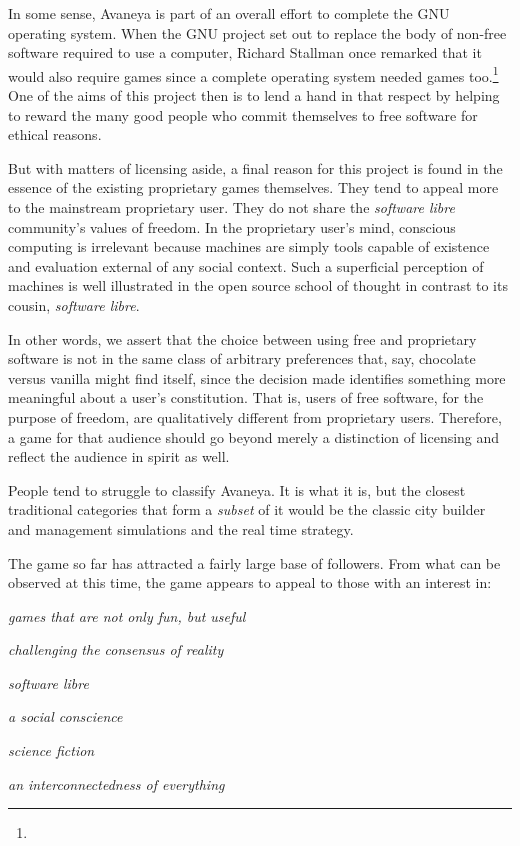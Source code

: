 In some sense, Avaneya is part of an overall effort to complete the GNU operating system. When the GNU project set out to replace the body of non-free software required to use a computer, Richard Stallman once remarked that it would also require games since a complete operating system needed games too.\footnote{} One of the aims of this project then is to lend a hand in that respect by helping to reward the many good people who commit themselves to free software for ethical reasons.

But with matters of licensing aside, a final reason for this project is found in the essence of the existing proprietary games themselves. They tend to appeal more to the mainstream proprietary user. They do not share the {\it software libre} community's values of freedom. In the proprietary user's mind, conscious computing is irrelevant because machines are simply tools capable of existence and evaluation external of any social context. Such a superficial perception of machines is well illustrated in the open source school of thought in contrast to its cousin, {\it software libre}.

In other words, we assert that the choice between using free and proprietary software is not in the same class of arbitrary preferences that, say, chocolate versus vanilla might find itself, since the decision made identifies something more meaningful about a user's constitution. That is, users of free software, for the purpose of freedom, are qualitatively different from proprietary users. Therefore, a game for that audience should go beyond merely a distinction of licensing and reflect the audience in spirit as well.

People tend to struggle to classify Avaneya. It is what it is, but the closest traditional categories that form a {\it subset} of it would be the classic city builder and management simulations and the real time strategy.

The game so far has attracted a fairly large base of followers. From what can be observed at this time, the game appears to appeal to those with an interest in:

\startitemize[3]
\item
{\it games that are not only fun, but useful}
\item
{\it challenging the consensus of reality}
\item
{\it software libre}
\item
{\it a social conscience}
\item
{\it science fiction}
\item
{\it an interconnectedness of everything}
\stopitemize

